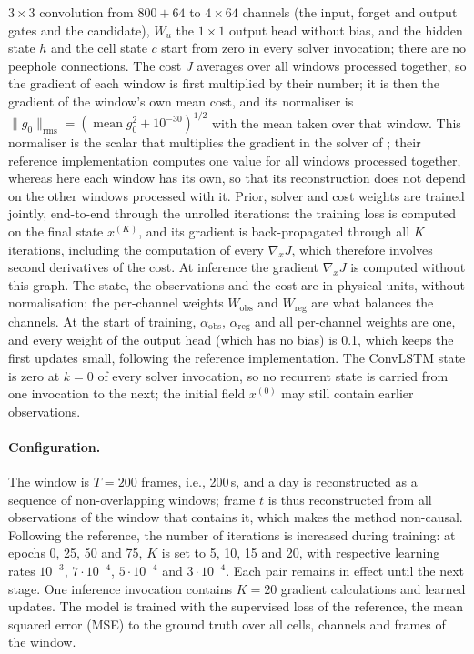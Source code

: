 \documentclass[english, 12pt, a4paper, elec, utf8, a-2b, online]{aaltothesis}
\begin{document}
$3 \times 3$ convolution from $800 + 64$ to $4 \times 64$ channels (the input,
forget and output gates and the candidate), $W_u$ the $1 \times 1$ output head
without bias, and the hidden state $h$ and the cell state $c$ start from zero
in every solver invocation; there are no peephole connections.
The cost $J$ averages over all windows processed together, so the gradient of
each window is first multiplied by their number; it is then the gradient of the
window's own mean cost, and its normaliser is
$\|g_0\|_{\mathrm{rms}} = (\operatorname{mean} g_0^2 + 10^{-30})^{1/2}$ with the mean
taken over that window. This normaliser is the scalar that multiplies the
gradient in the solver of \citeauthor{fablet2020fourdvarnet}
\cite{fablet2020fourdvarnet}; their reference implementation computes one value
for all windows processed together, whereas here each window has its own, so
that its reconstruction does not depend on the other windows processed with it.
Prior, solver and cost weights are trained jointly, end-to-end through the
unrolled iterations: the training loss is computed on the final state
$x^{(K)}$, and its gradient is back-propagated through all $K$ iterations,
including the computation of every $\nabla_x J$, which therefore involves
second derivatives of the cost. At inference the gradient $\nabla_x J$ is
computed without this graph. The state, the observations and the cost are in physical
units, without normalisation; the per-channel weights $W_{\mathrm{obs}}$ and
$W_{\mathrm{reg}}$ are what balances the channels. At the start of training,
$\alpha_{\mathrm{obs}}$, $\alpha_{\mathrm{reg}}$ and all per-channel weights are
one, and every weight of the output head (which has no bias) is 0.1, which keeps
the first updates small, following the reference implementation. The ConvLSTM
state is zero at $k = 0$ of every solver invocation, so no recurrent state is
carried from one invocation to the next; the initial field $x^{(0)}$ may still
contain earlier observations.

\paragraph{Configuration.}
The window is $T = 200$ frames, i.e., 200\,s, and a day is
reconstructed as a sequence of non-overlapping windows; frame $t$ is thus
reconstructed from all observations of the window that contains it, which makes
the method non-causal. Following the reference, the number of iterations is
increased during training: at epochs 0, 25, 50 and 75, $K$ is set to
5, 10, 15 and 20, with respective learning rates
$10^{-3}$, $7 \cdot 10^{-4}$, $5 \cdot 10^{-4}$ and $3 \cdot 10^{-4}$.
Each pair remains in effect until the next stage. One inference invocation
contains $K = 20$ gradient calculations and learned updates. The model is trained with the supervised loss of the reference,
the mean squared error (MSE) to the ground truth over all cells, channels and frames
of the window.
\end{document}
